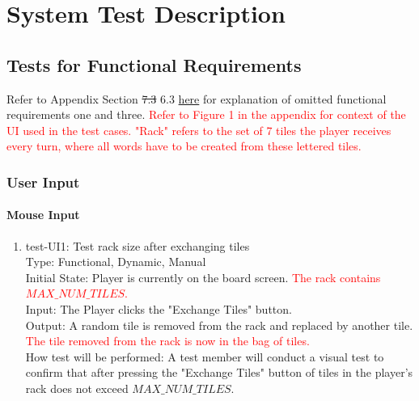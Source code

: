 \documentclass[12pt, titlepage]{article}
\begin{document}
\section{System Test Description}
	
\subsection{Tests for Functional Requirements} 
Refer to Appendix Section \sout{7.3} 6.3 \hyperref[sec:appendix]{here} for explanation of omitted functional requirements one and three. \textcolor{red}{Refer to Figure 1 in the appendix for context of the UI used in the test cases. "Rack" refers to the set of 7 tiles the player receives every turn, where all words have to be created from these lettered tiles.}

\subsubsection{User Input}

\paragraph{Mouse Input}

\begin{enumerate}
\item{test-UI1: Test rack size after exchanging tiles \\} %
    Type: Functional, Dynamic, Manual\\
    Initial State: Player is currently on the board screen. \textcolor{red}{The rack contains $MAX\_NUM\_TILES$.} \\
    Input: The Player clicks the "Exchange Tiles" button.\\
    Output: A random tile is removed from the rack and replaced by another tile. \textcolor{red}{The tile removed from the rack is now in the bag of tiles.}\\
    How test will be performed: A test member will conduct a visual test to confirm that after pressing the "Exchange Tiles" button of tiles in the player's rack does not exceed $MAX\_NUM\_TILES$.

\end{enumerate}
\end{document}
